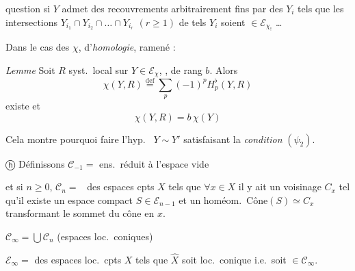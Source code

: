 \documentclass[11pt,a4paper]{article}
\begin{document}
 question si  $Y$   admet des recouvrements arbitrairement fins  par des $Y_i$   tels que les intersections $Y_{i_1} \cap Y_{i_2} \cap \dots \cap Y_{i_r}$ $(r \geq 1)$ de tels $Y_i$ soient $\in \mathcal{E}_{\chi_!}$ …

Dans le cas des $\chi$,  d'\emph{homologie},  ramené :

\emph{Lemme} Soit $R$ syst.\ local \ill{}  sur $Y \in \mathcal{E}_\chi$, , de rang $b$. Alors
\[
\chi(Y, R) \overset{\mathrm{def}}{=} \sum_p (-1)^p H_p^{\flat}(Y, R)
\]
existe et
\[
\chi(Y, R) = b\,\chi(Y)
\]

Cela montre pourquoi \ill{} faire l'hyp.\ \struck{\ill{}} $Y \sim Y'$ satisfaisant la \emph{condition} $(\psi_2)$.


ⓗ Définissons $\mathcal{C}_{-1} =$ ens.\ réduit à l'espace vide

et si $n \geq 0$, $\mathcal{C}_n =$  \ des espaces cpts $X$ tels que $\forall x \in X$ il y ait un voisinage $C_x$ tel qu'il existe un espace compact $S \in \mathcal{E}_{n-1}$ et un homéom.\ $\mathrm{Cône}(S) \simeq C_x$ transformant le sommet du cône en $x$.


$\mathcal{C}_\infty = \bigcup \mathcal{C}_n$ (espaces loc.\ coniques)

$\mathcal{E}_\infty =$ \struck{\ill{}} des espaces loc.\ cpts  $X$ tels que $\hat{X}$ soit loc.\ conique i.e.\ soit $\in \mathcal{C}_\infty$.
\end{document}
